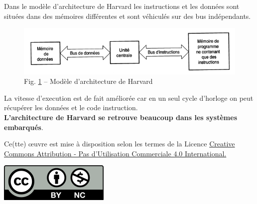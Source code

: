 \documentclass[11pt,french]{article}
\makeatletter
\def\maxwidth{\ifdim\Gin@nat@width>\linewidth\linewidth
    \else\Gin@nat@width\fi}
\let\Oldincludegraphics\includegraphics
\renewcommand{\includegraphics}[1]{\Oldincludegraphics[width=.8\maxwidth]{#1}}
\makeatother
\begin{document}
Dans le modèle d'architecture de Harvard les instructions et les données
sont situées dans des mémoires différentes et sont véhiculés sur des bus
indépendants. 
\begin{figure}[h]
	\begin{center}
		\includegraphics{../img/harvard.001.jpg} 
	\end{center}
	\caption{Fig. \ref{fig:harvard} -- Modèle d'architecture de Harvard}
	\label{fig:harvard}
\end{figure}

La vitesse d'execution
est de fait améliorée car en un seul cycle d'horloge on peut récupérer
les données et le code instruction.\\
\textbf{L'architecture de Harvard se retrouve beaucoup dans les systèmes
embarqués}.


\vspace{3cm} 
 Ce(tte) œuvre est mise à disposition selon les termes de la Licence
\href{https://creativecommons.org/licenses/by-nc/4.0/}{Creative Commons Attribution - Pas d'Utilisation Commerciale 4.0
International.}
\begin{center}
\includegraphics{../img/Cc-by-nc_icon.svg.png}
\end{center}      
    
    
    
\end{document}
